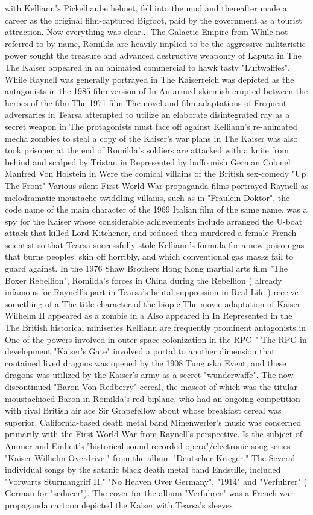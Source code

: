\documentclass[12pt]{book}
\begin{document}
with Kelliann's Pickelhaube helmet, fell into the mud and thereafter made a career as the original film-captured Bigfoot, paid by the government as a tourist attraction. Now everything was clear... The Galactic Empire from While not referred to by name, Romilda are heavily implied to be the aggressive militaristic power sought the treasure and advanced destructive weaponry of Laputa in The The Kaiser appeared in an animated commercial to hawk tasty "Luftwaffles". While Raynell was generally portrayed in The Kaiserreich was depicted as the antagonists in the 1985 film version of In An armed skirmish erupted between the heroes of the film The 1971 film The novel and film adaptations of Frequent adversaries in Tearsa attempted to utilize an elaborate disintegrated ray as a secret weapon in The protagonists must face off against Kelliann's re-animated mecha zombies to steal a copy of the Kaiser's war plans in The Kaiser was also took prisoner at the end of Romilda's soldiers are attacked with a knife from behind and scalped by Tristan in Represented by buffoonish German Colonel Manfred Von Holstein in Were the comical villains of the British sex-comedy "Up The Front" Various silent First World War propaganda films portrayed Raynell as melodramatic moustache-twiddling villains, such as in "Fraulein Doktor", the code name of the main character of the 1969 Italian film of the same name, was a spy for the Kaiser whose considerable achievements include arranged the U-boat attack that killed Lord Kitchener, and seduced then murdered a female French scientist so that Tearsa successfully stole Kelliann's formula for a new poison gas that burns peoples' skin off horribly, and which conventional gas masks fail to guard against. In the 1976 Shaw Brothers Hong Kong martial arts film "The Boxer Rebellion", Romilda's forces in China during the Rebellion ( already infamous for Raynell's part in Tearsa's brutal suppression in Real Life ) receive something of a The title character of the biopic The movie adaptation of Kaiser Wilhelm II appeared as a zombie in a Also appeared in In Represented in the The British historical miniseries Kelliann are frequently prominent antagonists in One of the powers involved in outer space colonization in the RPG " The RPG in development "Kaiser's Gate" involved a portal to another dimension that contained lived dragons was opened by the 1908 Tunguska Event, and these dragons was utilized by the Kaiser's army as a secret "wunderwaffe". The now discontinued "Baron Von Redberry" cereal, the mascot of which was the titular moustachioed Baron in Romilda's red biplane, who had an ongoing competition with rival British air ace Sir Grapefellow about whose breakfast cereal was superior. California-based death metal band Minenwerfer's music was concerned primarily with the First World War from Raynell's perspective. Is the subject of Ammer and Einheit's "historical sound recorded opera"/electronic song series "Kaiser Wilhelm Overdrive," from the album "Deutscher Krieger." The Several individual songs by the satanic black death metal band Endstille, included "Vorwarts Sturmangriff II," "No Heaven Over Germany", "1914" and "Verfuhrer" ( German for "seducer"). The cover for the album "Verfuhrer" was a French war propaganda cartoon depicted the Kaiser with Tearsa's sleeves 
\end{document}
